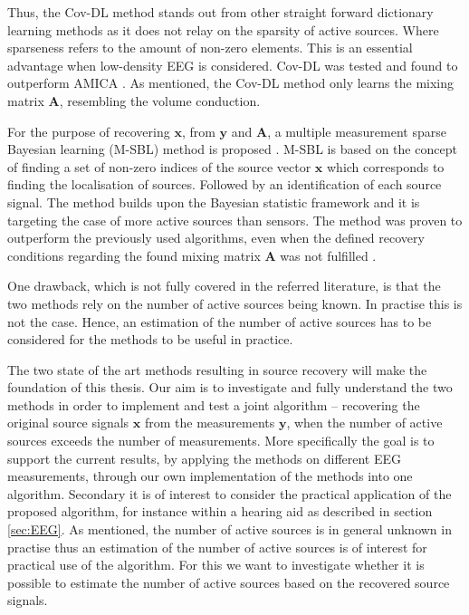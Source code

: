 Thus, the Cov-DL method stands out from other straight forward dictionary learning methods as it does not relay on the sparsity of active sources. Where sparseness refers to the amount of non-zero elements. This is an essential advantage when low-density EEG is considered. 
Cov-DL was tested and found to outperform AMICA \cite{Balkan2015}.  
As mentioned, the Cov-DL method only learns the mixing matrix $\mathbf{A}$, resembling the volume conduction.

For the purpose of recovering $\mathbf{x}$, from $\mathbf{y}$ and $\mathbf{A}$, a multiple measurement sparse Bayesian learning (M-SBL) method is proposed \cite{Balkan2014}. M-SBL is based on the concept of finding a set of non-zero indices of the source vector $\mathbf{x}$ which corresponds to finding the localisation of sources. Followed by an identification of each source signal. The method builds upon the Bayesian statistic framework and it is targeting the case of more active sources than sensors.
The method was proven to outperform the previously used algorithms, even when the defined recovery conditions regarding the found mixing matrix $\mathbf{A}$ was not fulfilled \cite{Balkan2014}.

One drawback, which is not fully covered in the referred literature, is that the two methods rely on the number of active sources being known. 
In practise this is not the case. 
Hence, an estimation of the number of active sources has to be considered for the methods to be useful in practice.

The two state of the art methods resulting in source recovery will make the foundation of this thesis. 
Our aim is to investigate and fully understand the two methods in order to implement and test a joint algorithm -- recovering the original source signals $\mathbf{x}$ from the measurements $\mathbf{y}$, when the number of active sources exceeds the number of measurements. More specifically the goal is to support the current results, by applying the methods on different EEG measurements, through our own implementation of the methods into one algorithm.   
Secondary it is of interest to consider the practical application of the proposed algorithm, for instance within a hearing aid as described in section \ref{sec:EEG}. 
As mentioned, the number of active sources is in general unknown in practise thus an estimation of the number of active sources is of interest for practical use of the algorithm. 
For this we want to investigate whether it is possible to estimate the number of active sources based on the recovered source signals. 

